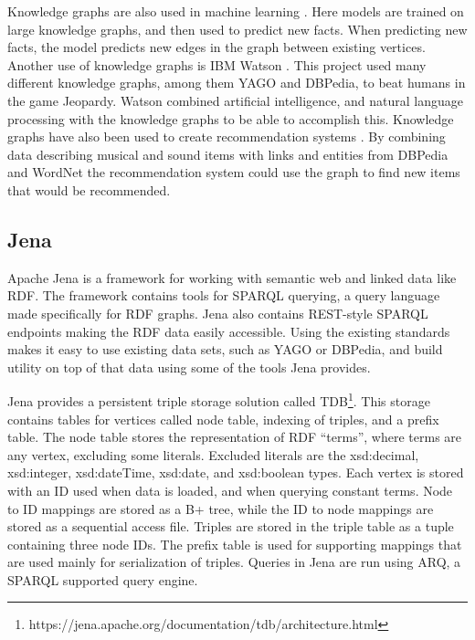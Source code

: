 Knowledge graphs are also used in machine learning \cite{nickel2015review}. Here models are trained on large knowledge graphs, and then used to predict new facts. When predicting new facts, the model predicts new edges in the graph between existing vertices. Another use of knowledge graphs is IBM Watson \cite{ferrucci2010building}. This project used many different knowledge graphs, among them YAGO and DBPedia, to beat humans in the game Jeopardy. Watson combined artificial intelligence, and natural language processing with the knowledge graphs to be able to accomplish this. Knowledge graphs have also been used to create recommendation systems \cite{oramas2016sound}. By combining data describing musical and sound items with links and entities from DBPedia and WordNet the recommendation system could use the graph to find new items that would be recommended. 

\subsection{Jena}
Apache Jena is a framework for working with semantic web and linked data like RDF. The framework contains tools for SPARQL querying, a query language made specifically for RDF graphs. Jena also contains REST-style SPARQL endpoints making the RDF data easily accessible. Using the existing standards makes it easy to use existing data sets, such as YAGO or DBPedia, and build utility on top of that data using some of the tools Jena provides.

Jena provides a persistent triple storage solution called TDB\footnote{https://jena.apache.org/documentation/tdb/architecture.html}. This storage contains tables for vertices called node table, indexing of triples, and a prefix table. The node table stores the representation of RDF ``terms'', where terms are any vertex, excluding some literals. Excluded literals are the xsd:decimal, xsd:integer, xsd:dateTime, xsd:date, and xsd:boolean types. Each vertex is stored with an ID used when data is loaded, and when querying constant terms. Node to ID mappings are stored as a B+ tree, while the ID to node mappings are stored as a sequential access file. Triples are stored in the triple table as a tuple containing three node IDs. The prefix table is used for supporting mappings that are used mainly for serialization of triples. Queries in Jena are run using ARQ, a SPARQL supported query engine.

\glsresetall